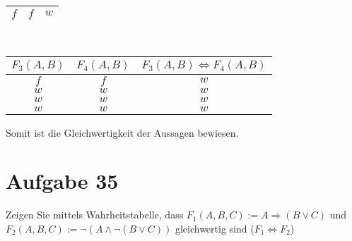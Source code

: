 \documentclass[10pt, oneside]{article}
\begin{document}
\begin{enumerate}[a)]
\begin{table*}[h]
\begin{minipage}{.29\linewidth}
\begin{tabular}{|c|c|c|}
                $f$ & $f$ & $w$ \\
                \hline
            \end{tabular}
        \end{minipage}  \\[15pt]
        \begin{minipage}{1\linewidth}
            \centering
            \begin{tabular}{|c|c|c|}
                \hline
                $F_3(A, B)$ & $F_4(A, B)$ & $F_3(A, B) \Leftrightarrow F_4(A, B)$ \\
                \hline
                $f$ & $f$ & $w$ \\
                \hline
                $w$ & $w$ & $w$ \\
                \hline
                $w$ & $w$ & $w$ \\
                \hline
                $w$ & $w$ & $w$ \\
                \hline
            \end{tabular}
        \end{minipage}
    \end{table*}
\end{enumerate}
Somit ist die Gleichwertigkeit der Aussagen bewiesen.

\pagebreak
\section{Aufgabe 35}

Zeigen Sie mittels Wahrheitstabelle, dass $F_1(A, B, C) := A \Rightarrow (B
\lor C)$ und $F_2(A, B, C) := \lnot(A \land \lnot(B \lor C))$ gleichwertig sind
($F_1 \Leftrightarrow F_2$)
\end{document}
